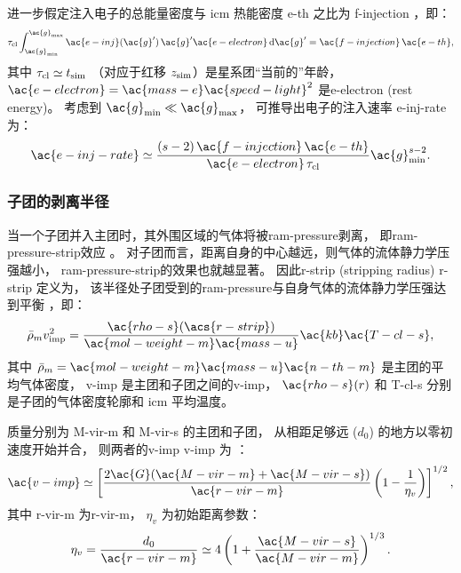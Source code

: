 进一步假定注入电子的总能量密度与 \ac{icm} 热能密度 \ac{e-th} 之比为
\ac{f-injection} \cite{cassano2005}，即：
\begin{equation}
  \tau_{\R{cl}} \int_{\ac{g}_{\R{min}}}^{\ac{g}_{\R{max}}}
  \ac{e-inj}(\ac{g}') \,\ac{g}'\ac{e-electron} \,\D{\ac{g}'}
    = \ac{f-injection} \,\ac{e-th} ,
\end{equation}
其中
$\tau_{\mathrm{cl}} \simeq t_{\mathrm{sim}}$
（对应于红移 $z_{\mathrm{sim}}$）是星系团\enquote{当前的}年龄，
$\ac{e-electron} = \ac{mass-e} \ac{speed-light}^2$
是\acl{e-electron} (rest energy)。
考虑到 $\ac{g}_{\R{min}} \ll \ac{g}_{\R{\max}}$，
可推导出电子的注入速率 \ac{e-inj-rate} 为：
\begin{equation}
  \label{eq:injrate}
  \ac{e-inj-rate} \simeq
    \frac{(s-2)\,\ac{f-injection}\,\ac{e-th}}{
      \ac{e-electron}\,\tau_{\R{cl}}} \ac{g}_{\R{min}}^{s-2} .
\end{equation}

\subsubsection{子团的剥离半径}

当一个子团并入主团时，其外围区域的气体将被\ac{ram-pressure}剥离，
即\acf{ram-pressure-strip}效应 \cite{gunn1972}。
对子团而言，距离自身的中心越远，则气体的流体静力学压强越小，
\ac{ram-pressure-strip}的效果也就越显著。
因此\acl{r-strip} (stripping radius) \ac{r-strip} 定义为，
该半径处子团受到的\ac{ram-pressure}与自身气体的流体静力学压强达到平衡
\cite{cassano2005}，即：
\begin{equation}
  \label{eq:rs-eqp}
  \bar{\rho}_m v_{\R{imp}}^2
    = \frac{\ac{rho-s}(\acs{r-strip})}{\ac{mol-weight-m} \ac{mass-u}}
      \ac{kb} \ac{T-cl-s} ,
\end{equation}
其中
$\bar{\rho}_m = \ac{mol-weight-m} \ac{mass-u} \ac{n-th-m}$
是主团的平均气体密度，
\ac{v-imp} 是主团和子团之间的\acl{v-imp}，
$\ac{rho-s}(r)$ 和 \ac{T-cl-s} 分别是子团的气体密度轮廓和 \ac{icm} 平均温度。

质量分别为 \ac{M-vir-m} 和 \ac{M-vir-s} 的主团和子团，
从相距足够远 ($d_0$) 的地方以零初速度开始并合，
则两者的\acl{v-imp} \ac{v-imp} 为 \cite{sarazin2002,cassano2005}：
\begin{equation}
  \label{eq:v-imp}
  \ac{v-imp} \simeq \left[
    \frac{2 \ac{G} (\ac{M-vir-m} + \ac{M-vir-s})}{\ac{r-vir-m}}
    \left( 1 - \frac{1}{\eta_v} \right)\right]^{1/2} ,
\end{equation}
其中
\ac{r-vir-m} 为\acl{r-vir-m}，
$\eta_v$ 为初始距离参数：
\begin{equation}
  \eta_v
    = \frac{d_0}{\ac{r-vir-m}}
    \simeq 4 \left( 1 + \frac{\ac{M-vir-s}}{\ac{M-vir-m}} \right)^{1/3} .
\end{equation}

